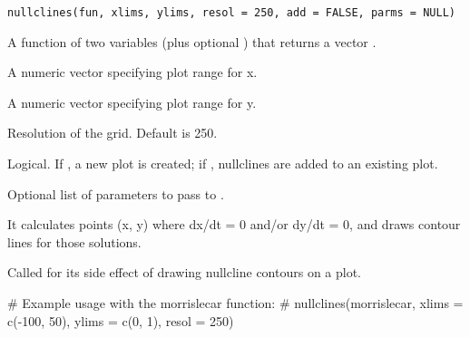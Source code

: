 \documentclass[a4paper]{book}
\begin{document}
%
\begin{Usage}
\begin{verbatim}
nullclines(fun, xlims, ylims, resol = 250, add = FALSE, parms = NULL)
\end{verbatim}
\end{Usage}
%
\begin{Arguments}
\begin{ldescription}
\item[\code{fun}] A function of two variables  (plus optional )
that returns a vector .

\item[\code{xlims}] A numeric vector  specifying plot range for x.

\item[\code{ylims}] A numeric vector  specifying plot range for y.

\item[\code{resol}] Resolution of the grid. Default is 250.

\item[\code{add}] Logical. If , a new plot is created; if ,
nullclines are added to an existing plot.

\item[\code{parms}] Optional list of parameters to pass to .
\end{ldescription}
\end{Arguments}
%
\begin{Details}

It calculates points (x, y) where dx/dt = 0 and/or dy/dt = 0, and draws
contour lines for those solutions.
\end{Details}
%
\begin{Value}
Called for its side effect of drawing nullcline contours on a plot.
\end{Value}
%
\begin{Examples}
\begin{ExampleCode}
# Example usage with the morrislecar function:
# nullclines(morrislecar, xlims = c(-100, 50), ylims = c(0, 1), resol = 250)
\end{ExampleCode}
\end{Examples}
\end{document}
